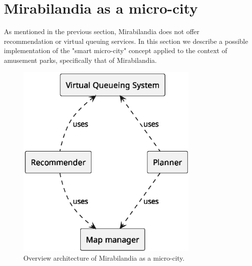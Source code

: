 \section{Mirabilandia as a micro-city}\label{sec:mira-microcity}

As mentioned in the previous section, Mirabilandia does not offer recommendation or virtual queuing services.
In this section we describe a possible implementation of the "smart micro-city" concept applied to the context of amusement parks, specifically that
of Mirabilandia.

\begin{figure}[H]
	\centering
	\includegraphics[width=0.8\textwidth]{img/architecture-overview.eps}
	\caption{Overview architecture of Mirabilandia as a micro-city.}
	\label{fig:architecture-overview}
\end{figure}